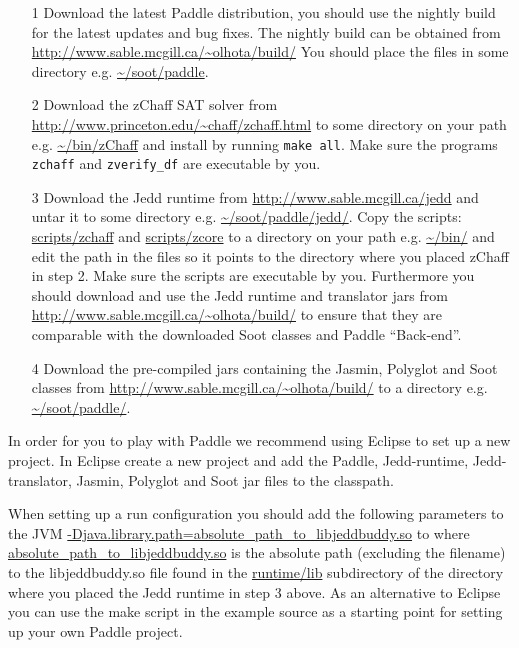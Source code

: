 \documentclass{article}
\newcommand{\code}[1]{\texttt{\small #1}}
\begin{document}
\begin{itemize}

\item[1] Download the latest Paddle distribution, you should use the
nightly build for the latest updates and bug fixes. The nightly build 
can be obtained from \url{http://www.sable.mcgill.ca/~olhota/build/}
You should place the files in some directory
e.g. \url{~/soot/paddle}.

\item[2] Download the zChaff SAT solver from \linebreak 
\url{http://www.princeton.edu/~chaff/zchaff.html} to some directory on
your path e.g. \url{~/bin/zChaff} and install by running \code{make
all}. Make sure the programs \code{zchaff} and \code{zverify\_df} are
executable by you.

\item[3] Download the Jedd runtime from
\url{http://www.sable.mcgill.ca/jedd} and untar it to some directory
e.g. \url{~/soot/paddle/jedd/}. Copy the scripts: \url{scripts/zchaff}
and \url{scripts/zcore} to a directory on your path e.g. \url{~/bin/}
and edit the path in the files so it points to the directory where you
placed zChaff in step 2. Make sure the scripts are executable by you.
Furthermore you should download and use the Jedd runtime and translator
jars from \url{http://www.sable.mcgill.ca/~olhota/build/} to ensure
that they are comparable with the downloaded Soot classes and Paddle
``Back-end''.

\item[4] Download the pre-compiled jars containing the Jasmin,
Polyglot and Soot classes from
\url{http://www.sable.mcgill.ca/~olhota/build/} to a directory
e.g. \url{~/soot/paddle/}.

\end{itemize}

In order for you to play with Paddle we recommend using Eclipse to set
up a new project. In Eclipse create a new project and add the Paddle,
Jedd-runtime, Jedd-translator, Jasmin, Polyglot and Soot jar files to
the classpath.

When setting up a run configuration you should add the following
parameters to the JVM
\url{-Djava.library.path=absolute\_path\_to\_libjeddbuddy.so} to where
\url{absolute\_path\_to\_libjeddbuddy.so} is the absolute path
(excluding the filename) to the libjeddbuddy.so file found in the
\url{runtime/lib} subdirectory of the directory where you placed the
Jedd runtime in step 3 above. As an alternative to Eclipse you can use
the make script in the example source as a starting point for setting
up your own Paddle project.
\end{document}
